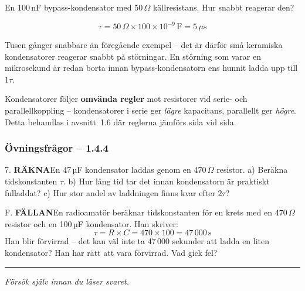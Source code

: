 \documentclass[a4paper,11pt,twoside]{book}
\newcommand{\emoji}[1]{{\emojifont #1}}
\newcommand{\qrakna}{\colorbox{bluepale}{\textcolor{bluedark}{\headingfont\bfseries\tiny RÄKNA}}}
\newcommand{\qfallan}{\colorbox{ljusbrun}{\textcolor{kakao}{\headingfont\bfseries\tiny FÄLLAN}}}
\begin{document}
\begin{worked}[title={Räkneexempel 1.4.4-2 -- Bypass-kondensator}]
En 100\,nF bypass-kondensator med 50\,$\Omega$ 
källresistans. Hur snabbt reagerar den?

\[ \tau = 50\,\Omega \times 100 \times 10^{-9}\,\text{F} = 5\,\mu\text{s} \]

Tusen gånger snabbare än föregående exempel -- det är 
därför små keramiska kondensatorer reagerar snabbt på 
störningar. En störning som varar en mikrosekund är redan 
borta innan bypass-kondensatorn ens hunnit ladda upp till $1\tau$.
\end{worked}

\begin{bluebox}[title={\emoji{📖} Serie- och parallellkoppling av kondensatorer}]
Kondensatorer följer \textbf{omvända regler} mot resistorer 
vid serie- och parallellkoppling -- kondensatorer i serie 
ger \emph{lägre} kapacitans, parallellt ger \emph{högre}. 
Detta behandlas i avsnitt~1.6 där reglerna jämförs sida 
vid sida.
\end{bluebox}

\subsubsection*{Övningsfrågor -- 1.4.4}

\begin{qblock}{7.}
\qrakna\quad En 47\,µF kondensator laddas genom en 
470\,$\Omega$ resistor. 
a) Beräkna tidskonstanten $\tau$. 
b) Hur lång tid tar det innan kondensatorn är praktiskt 
fulladdat? 
c) Hur stor andel av laddningen finns kvar efter $2\tau$?
\end{qblock}

\begin{qblock}{F.}
\qfallan\quad En radioamatör beräknar tidskonstanten för 
en krets med en 470\,$\Omega$ resistor och en 100\,µF 
kondensator. Han skriver:
\[
\tau = R \times C = 470 \times 100 = 47\,000\,\text{s}
\]
Han blir förvirrad -- det kan väl inte ta 47\,000 sekunder 
att ladda en liten kondensator? Han har rätt att vara 
förvirrad. Vad gick fel?
\end{qblock}

\medskip
\noindent\rule{\textwidth}{0.4pt}
{\small\itshape Försök själv innan du läser svaret.}
\medskip
\end{document}
